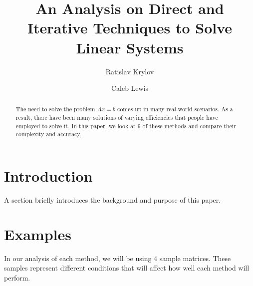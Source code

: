 \documentclass[11pt]{article}	%
\title{An Analysis on Direct and Iterative Techniques to Solve Linear Systems}
\author{Ratislav Krylov \and Caleb Lewis}
\begin{document}
\maketitle

\begin{abstract}
    The need to solve the problem $Ax = b$ comes up in many real-world scenarios.
    As a result, there have been many solutions of varying efficiencies that people
    have employed to solve it. In this paper, we look at 9 of these methods and
    compare their complexity and accuracy.
\end{abstract}

\section{Introduction}
A section briefly introduces the background and purpose of this paper.

\section{Examples}
In our analysis of each method, we will be using 4 sample matrices. These samples represent different conditions that will affect how well each method will perform.
\end{document}
